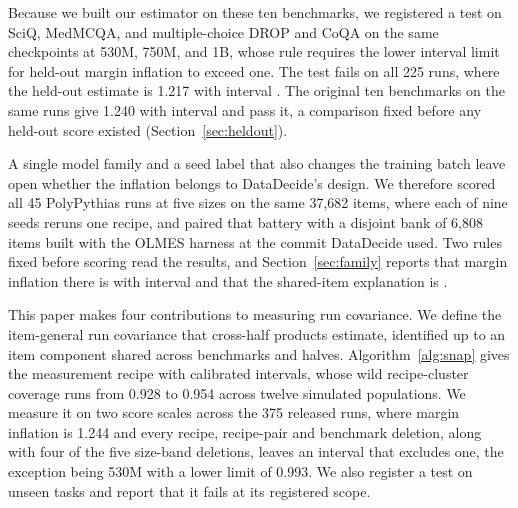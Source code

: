 Because we built our estimator on these ten benchmarks, we registered a test on SciQ, MedMCQA, and multiple-choice DROP and CoQA on the same checkpoints at 530M, 750M, and 1B, whose rule requires the lower interval limit for held-out margin inflation to exceed one. The test fails on all 225 runs, where the held-out estimate is 1.217 with interval . The original ten benchmarks on the same runs give 1.240 with interval  and pass it, a comparison fixed before any held-out score existed (Section~\ref{sec:heldout}).

A single model family and a seed label that also changes the training batch leave open whether the inflation belongs to DataDecide's design. We therefore scored all 45 PolyPythias runs at five sizes on the same 37,682 items, where each of nine seeds reruns one recipe, and paired that battery with a disjoint bank of 6,808 items built with the OLMES harness at the commit DataDecide used. Two rules fixed before scoring read the results, and Section~\ref{sec:family} reports that margin inflation there is  with interval  and that the shared-item explanation is .

This paper makes four contributions to measuring run covariance. We define the item-general run covariance that cross-half products estimate, identified up to an item component shared across benchmarks and halves. Algorithm~\ref{alg:snap} gives the measurement recipe with calibrated intervals, whose wild recipe-cluster coverage runs from 0.928 to 0.954 across twelve simulated populations. We measure it on two score scales across the 375 released runs, where margin inflation is 1.244 and every recipe, recipe-pair and benchmark deletion, along with four of the five size-band deletions, leaves an interval that excludes one, the exception being 530M with a lower limit of 0.993. We also register a test on unseen tasks and report that it fails at its registered scope.
